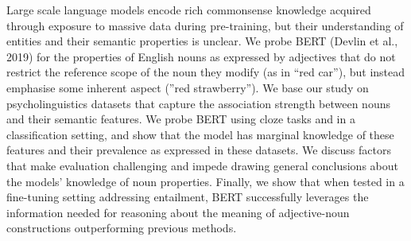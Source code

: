 Large scale language models encode rich commonsense knowledge acquired through exposure to massive data during pre-training, but their understanding of entities and their semantic properties is unclear. We probe BERT (Devlin et al., 2019) for the properties of English nouns as expressed by adjectives that do not restrict the reference scope of the noun they modify (as in ``red car''), but instead emphasise some inherent aspect (''red strawberry''). We base our study on psycholinguistics datasets that capture the association strength between nouns and their semantic features. We probe BERT using cloze tasks and in a classification setting, and show that the model has marginal knowledge of these features and their prevalence as expressed in these datasets. We discuss factors that make evaluation challenging and impede drawing general conclusions about the models' knowledge of noun properties. Finally, we show that when tested in a fine-tuning setting addressing entailment, BERT successfully leverages the information needed for reasoning about the meaning of adjective-noun constructions outperforming previous methods.
